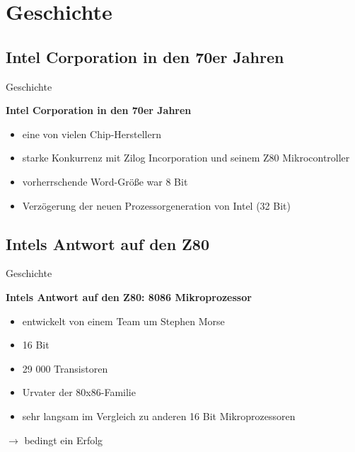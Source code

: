 \section{Geschichte}

\subsection{Intel Corporation in den 70er Jahren}
\begin{frame}{Geschichte}
	\begin{center}
		\textbf{Intel Corporation in den 70er Jahren}
	\end{center}
	\begin{itemize}
		\item eine von vielen Chip-Herstellern
		\item starke Konkurrenz mit Zilog Incorporation und seinem Z80 Mikrocontroller
		\item vorherrschende Word-Größe war 8 Bit
		\item Verzögerung der neuen Prozessorgeneration von Intel (32 Bit)
	\end{itemize}
\end{frame}

\subsection{Intels Antwort auf den Z80}
\begin{frame}{Geschichte}
	\begin{center}
		\textbf{Intels Antwort auf den Z80: 8086 Mikroprozessor}
	\end{center}
	\begin{itemize}
	 	\item entwickelt von einem Team um Stephen Morse 
		\item 16 Bit
		\item 29 000 Transistoren
		\item Urvater der 80x86-Familie 
		\item sehr langsam im Vergleich zu anderen 16 Bit Mikroprozessoren
	\end{itemize}

	$\rightarrow$ bedingt ein Erfolg
\end{frame}

